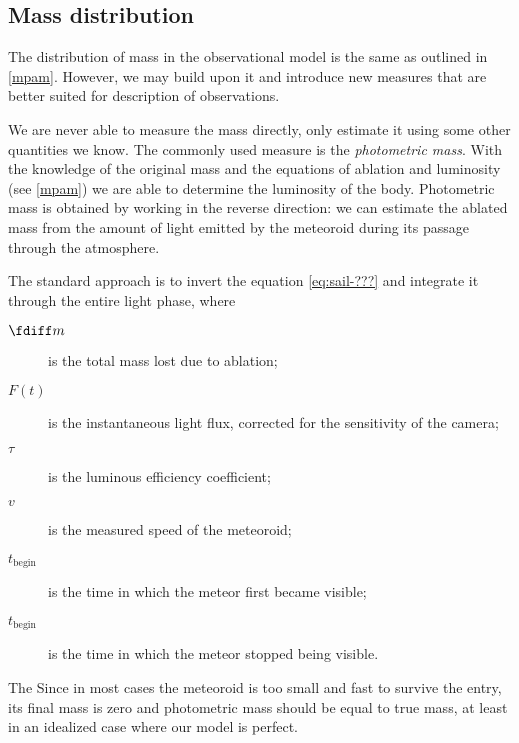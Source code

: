     \subsection{Mass distribution} \label{msm} 
        The distribution of mass in the observational model is the same as outlined in \cref{mpam}.
        However, we may build upon it and introduce new measures that are better suited for description
        of observations.

        We are never able to measure the mass directly, only estimate it using some other quantities we know.
        The commonly used measure is the \emph{photometric mass}. With the knowledge of the original mass
        and the equations of ablation and luminosity (see \cref{mpam}) we are able to determine the luminosity of the body.
        Photometric mass is obtained by working in the reverse direction: we can estimate the
        ablated mass from the amount of light emitted by the meteoroid during its passage through the atmosphere.

        The standard approach is to invert the equation \cref{eq:sail-???} and integrate it
        through the entire light phase,
        where
        \begin{description}
            \item[$\fdiff m$]
                is the total mass lost due to ablation;
            \item[$F(t)$]
                is the instantaneous light flux, corrected for the sensitivity of the camera;
            \item[$\tau$]
                is the luminous efficiency coefficient;
            \item[$v$]
                is the measured speed of the meteoroid;
            \item[$t_\mathrm{begin}$]
                is the time in which the meteor first became visible;
            \item[$t_\mathrm{begin}$]
                is the time in which the meteor stopped being visible.
        \end{description}

        The 
        Since in most cases the meteoroid is too small and fast to survive the entry, its final mass is zero
        and photometric mass should be equal to true mass, at least in an idealized case where our model is perfect.


